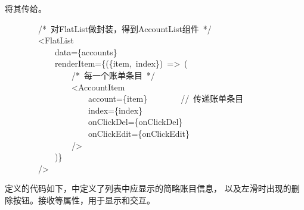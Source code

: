 \documentclass{article}
\begin{document}
将其传给。
\begin{mdpre}%
\noindent~~~~~~~~{/*}{~对FlatList做封装，得到AccountList组件~}{*/}\\
~~~~~~~~\textless{}FlatList\\
~~~~~~~~~~~~data=\{accounts\}\\
~~~~~~~~~~~~renderItem=\{(\{item,~index\})~=\textgreater{}~(\\
~~~~~~~~~~~~~~~~{/*}{~每一个账单条目~}{*/}\\
~~~~~~~~~~~~~~~~\textless{}AccountItem\\
~~~~~~~~~~~~~~~~~~~~account=\{item\}~~~~~~~~{//~传递账单条目}\\
~~~~~~~~~~~~~~~~~~~~index=\{index\}\\
~~~~~~~~~~~~~~~~~~~~onClickDel=\{onClickDel\}\\
~~~~~~~~~~~~~~~~~~~~onClickEdit=\{onClickEdit\}\\
~~~~~~~~~~~~~~~~/\textgreater{}\\
~~~~~~~~~~~~)\}\\
~~~~~~~~/\textgreater{}%
\end{mdpre}\noindent{}定义的代码如下，中定义了列表中应显示的简略账目信息，
以及左滑时出现的删除按钮。接收等属性，用于显示和交互。
\end{document}
